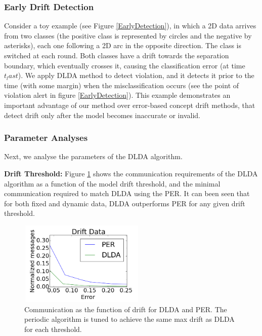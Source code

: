 \documentclass{sig-alternate-05-2015}
\begin{document}
\subsubsection{Early Drift Detection}\label{sec:earlydetection}
Consider a toy example (see Figure \ref{EarlyDetection}), in which a 2D data arrives from two classes (the positive class is represented by circles and the negative by asterisks), each one following a 2D arc in the opposite direction. The class is switched at each round. Both classes have a drift towards the separation boundary, which eventually crosses it, causing the classification error (at time $t_last$). We apply DLDA method to detect violation, and it detects it prior to the time  (with some margin) when the misclassification occurs (see the point of violation alert in figure \ref{EarlyDetection}). This example demonstrates an important advantage of our method over error-based concept drift methods, that detect drift only after the model becomes inaccurate or invalid.

\subsubsection{Parameter Analyses}\label{sec:paramanal}
Next, we analyse the parameters of the DLDA algorithm.

\noindent\textbf{Drift Threshold:} Figure \ref{PERvsDLDAoverError} shows the communication requirements of the DLDA algorithm as a function of the model drift threshold, and the minimal communication required to match DLDA using the PER.	
It can been seen that for both fixed and dynamic data, DLDA outperforms PER for
any given drift threshold.
 \begin{figure}[ht]
	\centering
	\includegraphics[width=60mm, height=4cm]{PER/onlyDrift.png}
	\caption{Communication as the function of drift for DLDA and PER. The
	periodic algorithm is tuned to achieve the same max drift as DLDA
	for each threshold.}
	\label{PERvsDLDAoverError}
	\end{figure}
\end{document}
